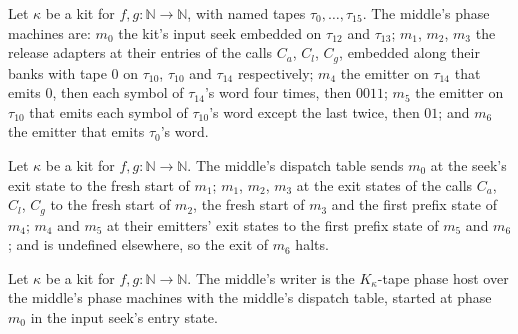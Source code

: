\begin{definition}
\label{Turing.NTimeDiag.qyMidM}
\leanok
{}
Let $\kappa$ be a kit for $f, g : \mathbb{N} \to \mathbb{N}$, with named tapes $\tau_0, \dots,
\tau_{15}$. The middle's phase machines are: $m_0$ the kit's input seek embedded on $\tau_{12}$
and $\tau_{13}$; $m_1$, $m_2$, $m_3$ the release adapters at their entries of the calls $C_a$,
$C_l$, $C_g$, embedded along their banks with tape $0$ on $\tau_{10}$, $\tau_{10}$ and $\tau_{14}$
respectively; $m_4$ the emitter on $\tau_{14}$ that emits $0$, then each symbol of $\tau_{14}$'s
word four times, then $0011$; $m_5$ the emitter on $\tau_{10}$ that emits each symbol of
$\tau_{10}$'s word except the last twice, then $01$; and $m_6$ the emitter that emits $\tau_0$'s
word.
\end{definition}

\begin{definition}
\label{Turing.NTimeDiag.qyMidRed}
\leanok
{}
Let $\kappa$ be a kit for $f, g : \mathbb{N} \to \mathbb{N}$. The middle's dispatch table sends
$m_0$ at the seek's exit state to the fresh start of $m_1$; $m_1$, $m_2$, $m_3$ at the exit states
of the calls $C_a$, $C_l$, $C_g$ to the fresh start of $m_2$, the fresh start of $m_3$ and the
first prefix state of $m_4$; $m_4$ and $m_5$ at their emitters' exit states to the first prefix
state of $m_5$ and $m_6$; and is undefined elsewhere, so the exit of $m_6$ halts.
\end{definition}

\begin{definition}
\label{Turing.NTimeDiag.qyMid}
\leanok
{}
Let $\kappa$ be a kit for $f, g : \mathbb{N} \to \mathbb{N}$. The middle's writer is the
$K_\kappa$-tape phase host over the middle's phase machines with the middle's dispatch table,
started at phase $m_0$ in the input seek's entry state.
\end{definition}

